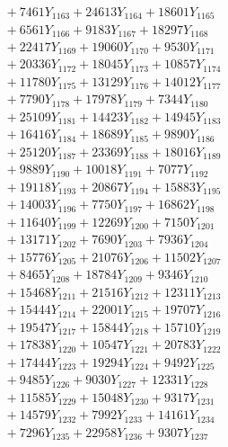 \documentclass[a4paper,10pt]{article}
\begin{document}
{\begin{align}
&\;  + 7461 Y_{1163} + 24613 Y_{1164} + 18601 Y_{1165} \\[0.3ex]
&\;  + 6561 Y_{1166} + 9183 Y_{1167} + 18297 Y_{1168} \\[0.5ex]\allowbreak
&\;  + 22417 Y_{1169} + 19060 Y_{1170} + 9530 Y_{1171} \\[0.3ex]
&\;  + 20336 Y_{1172} + 18045 Y_{1173} + 10857 Y_{1174} \\[0.3ex]
&\;  + 11780 Y_{1175} + 13129 Y_{1176} + 14012 Y_{1177} \\[0.3ex]
&\;  + 7790 Y_{1178} + 17978 Y_{1179} + 7344 Y_{1180} \\[0.3ex]
&\;  + 25109 Y_{1181} + 14423 Y_{1182} + 14945 Y_{1183} \\[0.3ex]
&\;  + 16416 Y_{1184} + 18689 Y_{1185} + 9890 Y_{1186} \\[0.3ex]
&\;  + 25120 Y_{1187} + 23369 Y_{1188} + 18016 Y_{1189} \\[0.3ex]
&\;  + 9889 Y_{1190} + 10018 Y_{1191} + 7077 Y_{1192} \\[0.3ex]
&\;  + 19118 Y_{1193} + 20867 Y_{1194} + 15883 Y_{1195} \\[0.3ex]
&\;  + 14003 Y_{1196} + 7750 Y_{1197} + 16862 Y_{1198} \\[0.5ex]\allowbreak
&\;  + 11640 Y_{1199} + 12269 Y_{1200} + 7150 Y_{1201} \\[0.3ex]
&\;  + 13171 Y_{1202} + 7690 Y_{1203} + 7936 Y_{1204} \\[0.3ex]
&\;  + 15776 Y_{1205} + 21076 Y_{1206} + 11502 Y_{1207} \\[0.3ex]
&\;  + 8465 Y_{1208} + 18784 Y_{1209} + 9346 Y_{1210} \\[0.3ex]
&\;  + 15468 Y_{1211} + 21516 Y_{1212} + 12311 Y_{1213} \\[0.3ex]
&\;  + 15444 Y_{1214} + 22001 Y_{1215} + 19707 Y_{1216} \\[0.3ex]
&\;  + 19547 Y_{1217} + 15844 Y_{1218} + 15710 Y_{1219} \\[0.3ex]
&\;  + 17838 Y_{1220} + 10547 Y_{1221} + 20783 Y_{1222} \\[0.3ex]
&\;  + 17444 Y_{1223} + 19294 Y_{1224} + 9492 Y_{1225} \\[0.3ex]
&\;  + 9485 Y_{1226} + 9030 Y_{1227} + 12331 Y_{1228} \\[0.5ex]\allowbreak
&\;  + 11585 Y_{1229} + 15048 Y_{1230} + 9317 Y_{1231} \\[0.3ex]
&\;  + 14579 Y_{1232} + 7992 Y_{1233} + 14161 Y_{1234} \\[0.3ex]
&\;  + 7296 Y_{1235} + 22958 Y_{1236} + 9307 Y_{1237} \\[0.3ex]

\end{align}}
\end{document}
